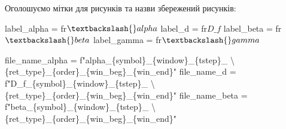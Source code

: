 \documentclass[
  letterpaper,
]{report}
\newenvironment{Shaded}{\begin{snugshade}}{\end{snugshade}}
\newcommand{\CharTok}[1]{\textcolor[rgb]{0.13,0.47,0.30}{#1}}
\newcommand{\NormalTok}[1]{\textcolor[rgb]{0.00,0.23,0.31}{#1}}
\newcommand{\OperatorTok}[1]{\textcolor[rgb]{0.37,0.37,0.37}{#1}}
\newcommand{\SpecialCharTok}[1]{\textcolor[rgb]{0.37,0.37,0.37}{#1}}
\newcommand{\SpecialStringTok}[1]{\textcolor[rgb]{0.13,0.47,0.30}{#1}}
\newcommand{\VerbatimStringTok}[1]{\textcolor[rgb]{0.13,0.47,0.30}{#1}}
\begin{document}
Оголошуємо мітки для рисунків та назви збережений рисунків:

\begin{Shaded}
\begin{Highlighting}[]
\NormalTok{label\_alpha }\OperatorTok{=} \VerbatimStringTok{fr\textquotesingle{}$\textbackslash{}alpha$\textquotesingle{}}
\NormalTok{label\_d }\OperatorTok{=} \VerbatimStringTok{fr\textquotesingle{}$D\_f$\textquotesingle{}}
\NormalTok{label\_beta }\OperatorTok{=} \VerbatimStringTok{fr\textquotesingle{}$\textbackslash{}beta$\textquotesingle{}}
\NormalTok{label\_gamma }\OperatorTok{=} \VerbatimStringTok{fr\textquotesingle{}$\textbackslash{}gamma$\textquotesingle{}}

\NormalTok{file\_name\_alpha }\OperatorTok{=} \SpecialStringTok{f"alpha\_}\SpecialCharTok{\{}\NormalTok{symbol}\SpecialCharTok{\}}\SpecialStringTok{\_}\SpecialCharTok{\{}\NormalTok{window}\SpecialCharTok{\}}\SpecialStringTok{\_}\SpecialCharTok{\{}\NormalTok{tstep}\SpecialCharTok{\}}\SpecialStringTok{\_ }\CharTok{\textbackslash{}}
\SpecialStringTok{            }\SpecialCharTok{\{}\NormalTok{ret\_type}\SpecialCharTok{\}}\SpecialStringTok{\_}\SpecialCharTok{\{}\NormalTok{order}\SpecialCharTok{\}}\SpecialStringTok{\_}\SpecialCharTok{\{}\NormalTok{win\_beg}\SpecialCharTok{\}}\SpecialStringTok{\_}\SpecialCharTok{\{}\NormalTok{win\_end}\SpecialCharTok{\}}\SpecialStringTok{"}
\NormalTok{file\_name\_d }\OperatorTok{=} \SpecialStringTok{f"D\_f\_}\SpecialCharTok{\{}\NormalTok{symbol}\SpecialCharTok{\}}\SpecialStringTok{\_}\SpecialCharTok{\{}\NormalTok{window}\SpecialCharTok{\}}\SpecialStringTok{\_}\SpecialCharTok{\{}\NormalTok{tstep}\SpecialCharTok{\}}\SpecialStringTok{\_ }\CharTok{\textbackslash{}}
\SpecialStringTok{            }\SpecialCharTok{\{}\NormalTok{ret\_type}\SpecialCharTok{\}}\SpecialStringTok{\_}\SpecialCharTok{\{}\NormalTok{order}\SpecialCharTok{\}}\SpecialStringTok{\_}\SpecialCharTok{\{}\NormalTok{win\_beg}\SpecialCharTok{\}}\SpecialStringTok{\_}\SpecialCharTok{\{}\NormalTok{win\_end}\SpecialCharTok{\}}\SpecialStringTok{"}
\NormalTok{file\_name\_beta }\OperatorTok{=} \SpecialStringTok{f"beta\_}\SpecialCharTok{\{}\NormalTok{symbol}\SpecialCharTok{\}}\SpecialStringTok{\_}\SpecialCharTok{\{}\NormalTok{window}\SpecialCharTok{\}}\SpecialStringTok{\_}\SpecialCharTok{\{}\NormalTok{tstep}\SpecialCharTok{\}}\SpecialStringTok{\_ }\CharTok{\textbackslash{}}
\SpecialStringTok{            }\SpecialCharTok{\{}\NormalTok{ret\_type}\SpecialCharTok{\}}\SpecialStringTok{\_}\SpecialCharTok{\{}\NormalTok{order}\SpecialCharTok{\}}\SpecialStringTok{\_}\SpecialCharTok{\{}\NormalTok{win\_beg}\SpecialCharTok{\}}\SpecialStringTok{\_}\SpecialCharTok{\{}\NormalTok{win\_end}\SpecialCharTok{\}}\SpecialStringTok{"}

\end{Highlighting}
\end{Shaded}
\end{document}
